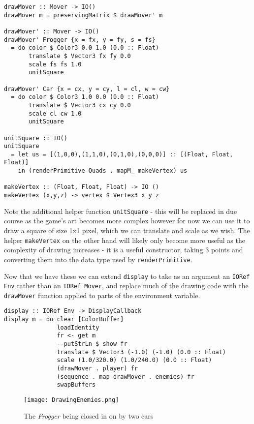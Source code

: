 \documentclass[12pt, a4paper]{report}
\begin{document}
\begin{lstlisting}
drawMover :: Mover -> IO()
drawMover m = preservingMatrix $ drawMover' m

drawMover' :: Mover -> IO()
drawMover' Frogger {x = fx, y = fy, s = fs}
  = do color $ Color3 0.0 1.0 (0.0 :: Float)
       translate $ Vector3 fx fy 0.0
       scale fs fs 1.0
       unitSquare

drawMover' Car {x = cx, y = cy, l = cl, w = cw}
  = do color $ Color3 1.0 0.0 (0.0 :: Float)
       translate $ Vector3 cx cy 0.0
       scale cl cw 1.0
       unitSquare

unitSquare :: IO()
unitSquare
  = let us = [(1,0,0),(1,1,0),(0,1,0),(0,0,0)] :: [(Float, Float, Float)]
    in (renderPrimitive Quads . mapM_ makeVertex) us

makeVertex :: (Float, Float, Float) -> IO ()
makeVertex (x,y,z) -> vertex $ Vertex3 x y z
\end{lstlisting}

Note the additional helper function \verb|unitSquare| - this will be replaced in due course as the game's art becomes more complex however for now we can use it to draw a square of size 1x1 pixel, which we can translate and scale as we wish.
The helper \verb|makeVertex| on the other hand will likely only become more useful as the complexity of drawing increases - it is a useful constructor, taking 3 points and converting them into the data type used by \verb|renderPrimitive|.

\par

Now that we have these we can extend \verb|display| to take as an argument an \verb|IORef Env| rather than an \verb|IORef Mover|, and replace much of the drawing code with the \verb|drawMover| function applied to parts of the environment variable.

\begin{lstlisting}
display :: IORef Env -> DisplayCallback
display m = do clear [ColorBuffer]
               loadIdentity
               fr <- get m
               --putStrLn $ show fr
               translate $ Vector3 (-1.0) (-1.0) (0.0 :: Float)
               scale (1.0/320.0) (1.0/240.0) (0.0 :: Float)
               (drawMover . player) fr
               (sequence . map drawMover . enemies) fr
               swapBuffers
\end{lstlisting}

\begin{figure}[ht]
  \centering
  \caption{The \textit{Frogger} being closed in on by two cars}
  \texttt{[image: DrawingEnemies.png]}
  \label{fig:drawingenemies}
\end{figure}
\end{document}
